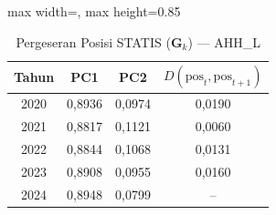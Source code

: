 \begin{table}[H]
\centering
\caption{Pergeseran Posisi STATIS ($\mathbf{G}_k$) --- AHH_L} \label{tab:app1jarak_statis_loading_ahh_l}
\begin{adjustbox}{max width=\textwidth, max height=0.85\textheight}
\begin{tabular}{|c|c|c|c|}
\hline
\textbf{Tahun} & \textbf{PC1} & \textbf{PC2} & \textbf{$D(\text{pos}_t, \text{pos}_{t+1})$} \\
\hline
2020 & 0,8936 & 0,0974 & 0,0190 \\
2021 & 0,8817 & 0,1121 & 0,0060 \\
2022 & 0,8844 & 0,1068 & 0,0131 \\
2023 & 0,8908 & 0,0955 & 0,0160 \\
2024 & 0,8948 & 0,0799 & -- \\
\hline
\end{tabular}
\end{adjustbox}
\end{table}